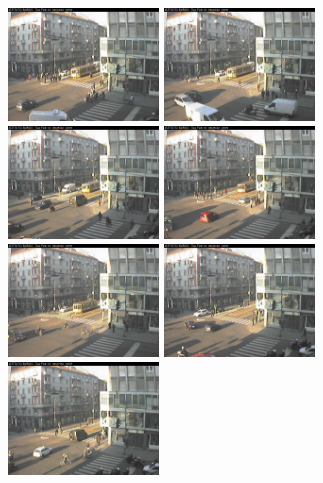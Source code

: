 \begin{figure}[tb]
	\centering
	\includegraphics[width = 4cm]{./pictures/FPSbasso/image2691}
	\includegraphics[width = 4cm]{./pictures/FPSbasso/image2692}
	\includegraphics[width = 4cm]{./pictures/FPSbasso/image2693}
	\includegraphics[width = 4cm]{./pictures/FPSbasso/image2694}
	\includegraphics[width = 4cm]{./pictures/FPSbasso/image2695}
	\includegraphics[width = 4cm]{./pictures/FPSbasso/image2696}
	\includegraphics[width = 4cm]{./pictures/FPSbasso/image2697}

\end{figure}

